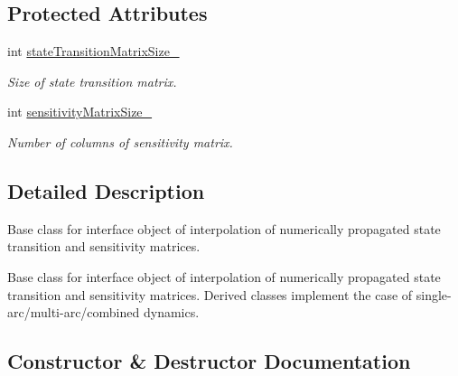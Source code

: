 \subsection*{Protected Attributes}
\begin{DoxyCompactItemize}
\item 
int \hyperlink{classtudat_1_1propagators_1_1CombinedStateTransitionAndSensitivityMatrixInterface_a2419c077b45a1d425985ba800760d51d}{state\+Transition\+Matrix\+Size\+\_\+}\hypertarget{classtudat_1_1propagators_1_1CombinedStateTransitionAndSensitivityMatrixInterface_a2419c077b45a1d425985ba800760d51d}{}\label{classtudat_1_1propagators_1_1CombinedStateTransitionAndSensitivityMatrixInterface_a2419c077b45a1d425985ba800760d51d}

\begin{DoxyCompactList}\small\item\em Size of state transition matrix. \end{DoxyCompactList}\item 
int \hyperlink{classtudat_1_1propagators_1_1CombinedStateTransitionAndSensitivityMatrixInterface_a0809a46cc2fcb71ad5bcabaf75afff20}{sensitivity\+Matrix\+Size\+\_\+}\hypertarget{classtudat_1_1propagators_1_1CombinedStateTransitionAndSensitivityMatrixInterface_a0809a46cc2fcb71ad5bcabaf75afff20}{}\label{classtudat_1_1propagators_1_1CombinedStateTransitionAndSensitivityMatrixInterface_a0809a46cc2fcb71ad5bcabaf75afff20}

\begin{DoxyCompactList}\small\item\em Number of columns of sensitivity matrix. \end{DoxyCompactList}\end{DoxyCompactItemize}


\subsection{Detailed Description}
Base class for interface object of interpolation of numerically propagated state transition and sensitivity matrices. 

Base class for interface object of interpolation of numerically propagated state transition and sensitivity matrices. Derived classes implement the case of single-\/arc/multi-\/arc/combined dynamics. 

\subsection{Constructor \& Destructor Documentation}
